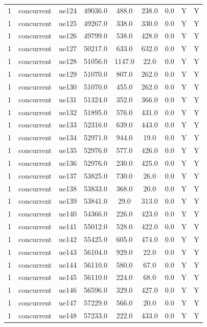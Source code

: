 \begin{table}[ht]
\begin{tabular}{|c|c|c|c|c|c|c|c|c|}
1 & concurrent & ue124 & 49036.0 & 488.0 & 238.0 & 0.0 & Y & Y \\
1 & concurrent & ue125 & 49267.0 & 338.0 & 330.0 & 0.0 & Y & Y \\
1 & concurrent & ue126 & 49799.0 & 538.0 & 428.0 & 0.0 & Y & Y \\
1 & concurrent & ue127 & 50217.0 & 633.0 & 632.0 & 0.0 & Y & Y \\
1 & concurrent & ue128 & 51056.0 & 1147.0 & 22.0 & 0.0 & Y & Y \\
1 & concurrent & ue129 & 51070.0 & 807.0 & 262.0 & 0.0 & Y & Y \\
1 & concurrent & ue130 & 51070.0 & 455.0 & 262.0 & 0.0 & Y & Y \\
1 & concurrent & ue131 & 51324.0 & 352.0 & 366.0 & 0.0 & Y & Y \\
1 & concurrent & ue132 & 51895.0 & 576.0 & 431.0 & 0.0 & Y & Y \\
1 & concurrent & ue133 & 52316.0 & 639.0 & 443.0 & 0.0 & Y & Y \\
1 & concurrent & ue134 & 52971.0 & 944.0 & 19.0 & 0.0 & Y & Y \\
1 & concurrent & ue135 & 52976.0 & 577.0 & 426.0 & 0.0 & Y & Y \\
1 & concurrent & ue136 & 52976.0 & 230.0 & 425.0 & 0.0 & Y & Y \\
1 & concurrent & ue137 & 53825.0 & 730.0 & 26.0 & 0.0 & Y & Y \\
1 & concurrent & ue138 & 53833.0 & 368.0 & 20.0 & 0.0 & Y & Y \\
1 & concurrent & ue139 & 53841.0 & 29.0 & 313.0 & 0.0 & Y & Y \\
1 & concurrent & ue140 & 54366.0 & 226.0 & 423.0 & 0.0 & Y & Y \\
1 & concurrent & ue141 & 55012.0 & 528.0 & 422.0 & 0.0 & Y & Y \\
1 & concurrent & ue142 & 55425.0 & 605.0 & 474.0 & 0.0 & Y & Y \\
1 & concurrent & ue143 & 56104.0 & 929.0 & 22.0 & 0.0 & Y & Y \\
1 & concurrent & ue144 & 56110.0 & 580.0 & 67.0 & 0.0 & Y & Y \\
1 & concurrent & ue145 & 56110.0 & 224.0 & 68.0 & 0.0 & Y & Y \\
1 & concurrent & ue146 & 56596.0 & 329.0 & 427.0 & 0.0 & Y & Y \\
1 & concurrent & ue147 & 57229.0 & 566.0 & 20.0 & 0.0 & Y & Y \\
1 & concurrent & ue148 & 57233.0 & 222.0 & 433.0 & 0.0 & Y & Y \\

\end{tabular}
\end{table}
